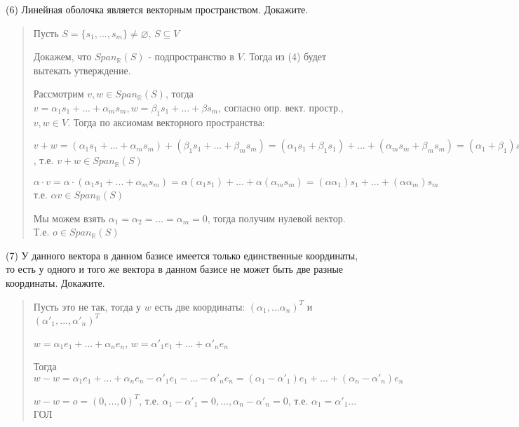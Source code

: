 \documentclass{article}
\begin{document}
(6) Линейная оболочка является векторным пространством. Докажите. 
\begin{quote}
    Пусть $S = \{s_1, ..., s_m \} \not= \varnothing$, $S \subseteq V$

    Докажем, что $Span_{\mathbb{R}}(S)$ - подпространство в $V$. Тогда из (4) будет вытекать утверждение.

    Рассмотрим $v, w \in Span_{\mathbb{R}}(S)$, тогда $v = \alpha_1 s_1 + ... + \alpha_m s_m, w = \beta_1 s_1 + ... + \beta s_m$, согласно опр. вект. простр., $v, w \in V$. Тогда по аксиомам векторного пространства:

    $v + w = (\alpha_1 s_1 + ... + \alpha_m s_m) + (\beta_1 s_1 + ... + \beta_m s_m) = (\alpha_1 s_1 + \beta_1 s_1) + ... + (\alpha_m s_m + \beta_m s_m) = (\alpha_1 + \beta_1) s_1 + (\alpha_m + \beta_m) s_m$, т.е. $v + w \in Span_{\mathbb{R}}(S)$

    $\alpha \cdot v = \alpha \cdot (\alpha_1 s_1 + ... + \alpha_m s_m) = \alpha (\alpha_1 s_1) + ... + \alpha (\alpha_m s_m) = (\alpha \alpha_1) s_1 + ... + (\alpha \alpha_m) s_m$ т.е. $\alpha v \in Span_{\mathbb{R}}(S)$

    Мы можем взять $\alpha_1 = \alpha_2 = ... = \alpha_m = 0$, тогда получим нулевой вектор. Т.е. $o \in Span_{\mathbb{R}}(S)$
\end{quote}

(7) У данного вектора в данном базисе имеется только единственные координаты, то есть у одного и того же вектора в данном базисе не может быть две разные координаты. Докажите.
\begin{quote}
   Пусть это не так, тогда у $w$ есть две координаты: $(\alpha_1 , ... \alpha_n)^T$ и $(\alpha'_1, ..., \alpha'_n)^T$ 

   $w = \alpha_1 e_1 + ... + \alpha_n e_n$,
   $w = \alpha'_1 e_1 + ... + \alpha'_n e_n$

   Тогда $w - w = \alpha_1 e_1 + ... + \alpha_n e_n - \alpha'_1 e_1 - ... - \alpha'_n e_n = (\alpha_1 - \alpha'_1)e_1 + ... + (\alpha_n - \alpha'_n)e_n$

   $w - w = o = (0, ..., 0)^T$, т.е. $\alpha_1 - \alpha'_1 = 0, ..., \alpha_n - \alpha'_n = 0$, т.е. $\alpha_1 = \alpha'_1 ...$ ГОЛ
\end{quote}
\end{document}
